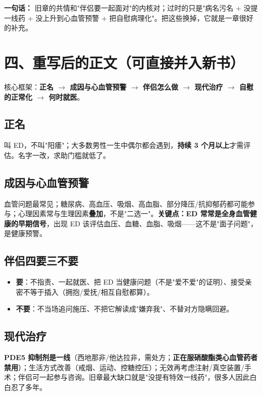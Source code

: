 \documentclass[12pt,UTF8,openany]{ctexbook}
\begin{document}
\vspace{0.5em}
\noindent\textbf{一句话：} 旧章的共情和"伴侣要一起面对"的内核对；过时的只是"病名污名 + 没提一线药 + 没上升到心血管预警 + 把自慰病理化"。把这些换掉，它就是一章很好的补充。

\section{四、重写后的正文（可直接并入新书）}

核心框架：\textbf{正名 $\rightarrow$ 成因与心血管预警 $\rightarrow$ 伴侣怎么做 $\rightarrow$ 现代治疗 $\rightarrow$ 自慰的正常化 $\rightarrow$ 何时就医}。

\subsection*{正名}
叫 ED，不叫"阳痿"；大多数男性一生中偶尔都会遇到，\textbf{持续 3 个月以上}才需评估。名字一改，求助门槛就低了。

\subsection*{成因与心血管预警}
血管问题最常见；糖尿病、高血压、吸烟、高血脂、部分降压/抗抑郁药都可能参与；心理因素常与生理因素\textbf{叠加}，不是"二选一"。\textbf{关键点：ED 常常是全身血管健康的早期信号}，出现 ED 该评估血压、血糖、血脂、吸烟——这不是"面子问题"，是健康预警。

\subsection*{伴侣四要三不要}
\begin{itemize}
  \item \textbf{要}：不指责、一起就医、把 ED 当健康问题（不是"爱不爱"的证明）、接受亲密不等于插入（拥抱/爱抚/相互自慰都算）。
  \item \textbf{不要}：不当场追问施压、不把它解读成"嫌弃我"、不替对方隐瞒回避。
\end{itemize}

\subsection*{现代治疗}
\textbf{PDE5 抑制剂是一线}（西地那非/他达拉非，需处方；\textbf{正在服硝酸酯类心血管药者禁用}）；生活方式改善（戒烟、运动、控糖控压）；无效再考虑注射/真空装置/手术；伴侣可一起参与咨询。旧章最大缺口就是"没提有特效一线药"，很多人因此白白忍了多年。
\end{document}
